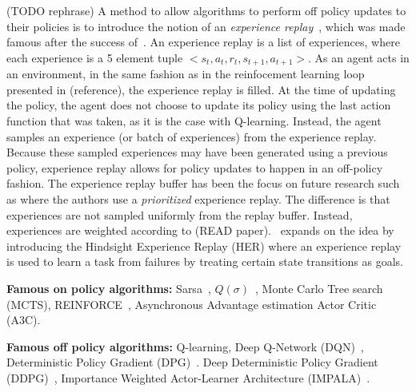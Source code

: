 \documentclass{../main.tex}{}
\begin{document}
(TODO rephrase)
A method to allow algorithms to perform off policy updates to their policies is to introduce the notion of an \textit{experience replay}~\citep{Lin1993}, which was made famous after the success of~\cite{Mnih2013}. An experience replay is a list of experiences, where each experience is a 5 element tuple $<s_t, a_t, r_t, s_{t+1}, a_{t+1}>$. As an agent acts in an environment, in the same fashion as in the reinfocement learning loop presented in (reference), the experience replay is filled. At the time of updating the policy, the agent does not choose to update its policy using the last action function that was taken, as it is the case with Q-learning. Instead, the agent samples an experience (or batch of experiences) from the experience replay. Because these sampled experiences may have been generated using a previous policy, experience replay allows for policy updates to happen in an off-policy fashion. The experience replay buffer has been the focus on future research such as \citep{Schaul2015, Hessel2017} where the authors use a \textit{prioritized} experience replay. The difference is that experiences are not sampled uniformly from the replay buffer. Instead, experiences are weighted according to (READ paper).~\cite{Andrychowicz2017} expands on the idea by introducing the Hindsight Experience Replay (HER) where an experience replay is used to learn a task from failures by treating certain state transitions as goals.


\textbf{Famous on policy algorithms:} Sarsa~\citep{Sutton1998}, $Q(\sigma)$~\citep{Deasis2017}, Monte Carlo Tree search (MCTS), REINFORCE~\citep{Williams1992}, Asynchronous Advantage estimation Actor Critic (A3C).

\textbf{Famous off policy algorithms:} Q-learning, Deep Q-Network (DQN)~\citep{Mnih2013}, Deterministic Policy Gradient (DPG)~\citep{Silver2014}. Deep Deterministic Policy Gradient (DDPG)~\citep{Lillicrap2015}, Importance Weighted Actor-Learner Architecture (IMPALA)~\citep{Espeholt2018}.


% 
\end{document}
